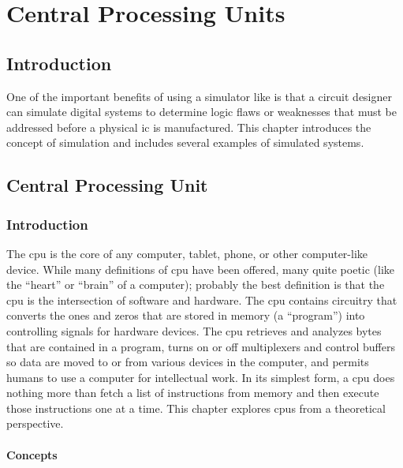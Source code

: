 \chapter{Central Processing Units}\label{ch14}
\section{Introduction}

One of the important benefits of using a simulator like \Le is that a circuit designer can simulate digital systems to determine logic flaws or weaknesses that must be addressed before a physical \gls{ic} is manufactured. This chapter introduces the concept of simulation and includes several examples of simulated systems.

\section{Central Processing Unit}
\label{SIM:sec:cpu}

\subsection{Introduction}
\label{SIM:subsec:intro_to_cpu}

The \gls{cpu} is the core of any computer, tablet, phone, or other computer-like device. While many definitions of \gls{cpu} have been offered, many quite poetic (like the ``heart'' or ``brain'' of a computer); probably the best definition is that the \gls{cpu} is the intersection of software and hardware. The \gls{cpu} contains circuitry that converts the ones and zeros that are stored in memory (a ``program'') into controlling signals for hardware devices. The \gls{cpu} retrieves and analyzes bytes that are contained in a program, turns on or off multiplexers and control buffers so data are moved to or from various devices in the computer, and permits humans to use a computer for intellectual work. In its simplest form, a \gls{cpu} does nothing more than fetch a list of instructions from memory and then execute those instructions one at a time. This chapter explores \glspl{cpu} from a theoretical perspective.

\subsubsection{Concepts}

